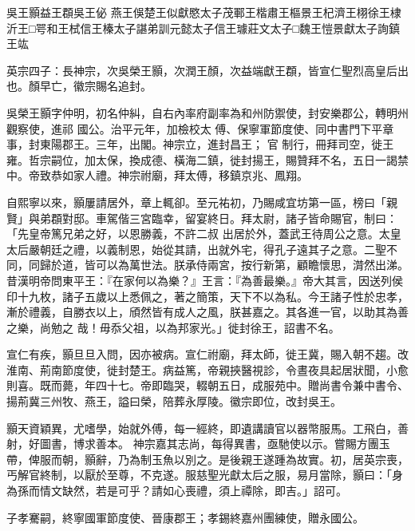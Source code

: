 
\begin{pinyinscope}

 吳王顥益王頵吳王佖
 燕王俁楚王似獻愍太子茂鄆王楷肅王樞景王杞濟王栩徐王棣沂王□咢和王栻信王榛太子諶弟訓元懿太子信王璩莊文太子□魏王愷景獻太子詢鎮王竑



 英宗四子：長神宗，次吳榮王顥，次潤王顏，次益端獻王頵，皆宣仁聖烈高皇后出也。顏早亡，徽宗賜名追封。



 吳榮王顥字仲明，初名仲糾，自右內率府副率為和州防禦使，封安樂郡公，轉明州觀察使，進祁
 國公。治平元年，加檢校太
 傅、保寧軍節度使、同中書門下平章事，封東陽郡王。三年，出閣。神宗立，進封昌王；
 官
 制行，冊拜司空，徙王雍。哲宗嗣位，加太保，換成德、橫海二鎮，徙封揚王，賜贊拜不名，五日一謁禁中。帝致恭如家人禮。神宗祔廟，拜太傅，移鎮京兆、鳳翔。



 自熙寧以來，顥屢請居外，章上輒卻。至元祐初，乃賜咸宜坊第一區，榜曰「親賢」與弟頵對邸。車駕偕三宮臨幸，留宴終日。拜太尉，諸子皆命賜官，制曰：「先皇帝篤兄弟之好，以恩勝義，不許二叔
 出居於外，蓋武王待周公之意。太皇太后嚴朝廷之禮，以義制恩，始從其請，出就外宅，得孔子遠其子之意。二聖不同，同歸於道，皆可以為萬世法。朕承侍兩宮，按行新第，顧瞻懷思，潸然出涕。昔漢明帝問東平王：『在家何以為樂？』王言：『為善最樂。』帝大其言，因送列侯印十九枚，諸子五歲以上悉佩之，著之簡策，天下不以為私。今王諸子性於忠孝，漸於禮義，自勝衣以上，頎然皆有成人之風，朕甚嘉之。其各進一官，以助其為善之樂，尚勉之
 哉！毋忝父祖，以為邦家光。」徙封徐王，詔書不名。



 宣仁有疾，顥旦旦入問，因亦被病。宣仁祔廟，拜太師，徙王冀，賜入朝不趨。改淮南、荊南節度使，徙封楚王。病益篤，帝親挾醫視診，令晝夜具起居狀聞，小愈則喜。既而薨，年四十七。帝即臨哭，輟朝五日，成服苑中。贈尚書令兼中書令、揚荊冀三州牧、燕王，謚曰榮，陪葬永厚陵。徽宗即位，改封吳王。



 顥天資穎異，尤嗜學，始就外傅，每一經終，即遺講讀官以器幣服馬。工飛白，善射，好圖書，博求善本。
 神宗嘉其志尚，每得異書，亟馳使以示。嘗賜方團玉帶，俾服而朝，顥辭，乃為制玉魚以別之。是後親王遂踵為故實。初，居英宗喪，丐解官終制，以厭於至尊，不克遂。服慈聖光獻太后之服，易月當除，顥曰：「身為孫而情文缺然，若是可乎？請如心喪禮，須上禫除，即吉。」詔可。



 子孝騫嗣，終寧國軍節度使、晉康郡王；孝錫終嘉州團練使，贈永國公。




\end{pinyinscope}
